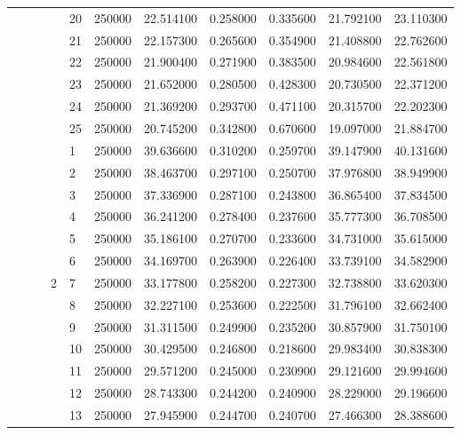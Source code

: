 \begin{tabular}{llllllrrrrr}
\cline{5-11}
 &  &  &  & 20 & 250000 & 22.514100 & 0.258000 & 0.335600 & 21.792100 & 23.110300 \\
\cline{5-11}
 &  &  &  & 21 & 250000 & 22.157300 & 0.265600 & 0.354900 & 21.408800 & 22.762600 \\
\cline{5-11}
 &  &  &  & 22 & 250000 & 21.900400 & 0.271900 & 0.383500 & 20.984600 & 22.561800 \\
\cline{5-11}
 &  &  &  & 23 & 250000 & 21.652000 & 0.280500 & 0.428300 & 20.730500 & 22.371200 \\
\cline{5-11}
 &  &  &  & 24 & 250000 & 21.369200 & 0.293700 & 0.471100 & 20.315700 & 22.202300 \\
\cline{5-11}
 &  &  &  & 25 & 250000 & 20.745200 & 0.342800 & 0.670600 & 19.097000 & 21.884700 \\
\cline{4-11} \cline{5-11}
 &  &  & \multirow[t]{25}{*}{2} & 1 & 250000 & 39.636600 & 0.310200 & 0.259700 & 39.147900 & 40.131600 \\
\cline{5-11}
 &  &  &  & 2 & 250000 & 38.463700 & 0.297100 & 0.250700 & 37.976800 & 38.949900 \\
\cline{5-11}
 &  &  &  & 3 & 250000 & 37.336900 & 0.287100 & 0.243800 & 36.865400 & 37.834500 \\
\cline{5-11}
 &  &  &  & 4 & 250000 & 36.241200 & 0.278400 & 0.237600 & 35.777300 & 36.708500 \\
\cline{5-11}
 &  &  &  & 5 & 250000 & 35.186100 & 0.270700 & 0.233600 & 34.731000 & 35.615000 \\
\cline{5-11}
 &  &  &  & 6 & 250000 & 34.169700 & 0.263900 & 0.226400 & 33.739100 & 34.582900 \\
\cline{5-11}
 &  &  &  & 7 & 250000 & 33.177800 & 0.258200 & 0.227300 & 32.738800 & 33.620300 \\
\cline{5-11}
 &  &  &  & 8 & 250000 & 32.227100 & 0.253600 & 0.222500 & 31.796100 & 32.662400 \\
\cline{5-11}
 &  &  &  & 9 & 250000 & 31.311500 & 0.249900 & 0.235200 & 30.857900 & 31.750100 \\
\cline{5-11}
 &  &  &  & 10 & 250000 & 30.429500 & 0.246800 & 0.218600 & 29.983400 & 30.838300 \\
\cline{5-11}
 &  &  &  & 11 & 250000 & 29.571200 & 0.245000 & 0.230900 & 29.121600 & 29.994600 \\
\cline{5-11}
 &  &  &  & 12 & 250000 & 28.743300 & 0.244200 & 0.240900 & 28.229000 & 29.196600 \\
\cline{5-11}
 &  &  &  & 13 & 250000 & 27.945900 & 0.244700 & 0.240700 & 27.466300 & 28.388600 \\

\end{tabular}
